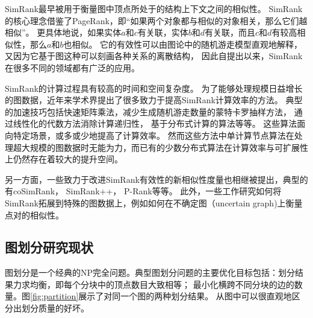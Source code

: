 \documentclass[master]{njuthesis}
\begin{document}
SimRank\cite{jeh2002simrank}最早被用于衡量图中顶点所处于的结构上下文之间的相似性。
SimRank的核心理念借鉴了PageRank\cite{page1999pagerank}，即“如果两个对象都与相似的对象相关，那么它们越相似”。
更具体地说，如果实体$a$和$c$有关联，实体$b$和$d$有关联，而且$c$和$d$有较高相似性，那么$a$和$b$也相似。
它的有效性可以由图论中的随机游走模型直观地解释，又因为它基于图这种可以刻画各种关系的离散结构，
因此自提出以来，SimRank在很多不同的领域都有广泛的应用。

SimRank的计算过程具有较高的时间和空间复杂度。
为了能够处理规模日益增长的图数据，近年来学术界提出了很多致力于提高SimRank计算效率的方法。
典型的加速技巧包括快速矩阵乘法\cite{yu2012space}，减少生成随机游走数量的蒙特卡罗抽样方法\cite{kusumoto2014scalable}，
通过线性化的代数方法消除计算递归性\cite{DBLP:journals/corr/MaeharaKK14}，
基于分布式计算的算法\cite{cao2012delta}等等。
这些算法面向特定场景，或多或少地提高了计算效率。
然而这些方法中单计算节点算法在处理超大规模的图数据时无能为力，而已有的少数分布式算法在计算效率与可扩展性上仍然存在着较大的提升空间。

另一方面，一些致力于改进SimRank有效性的新相似性度量也相继被提出，典型的有coSimRank\cite{DBLP:conf/acl/RotheS14}，
SimRank++\cite{DBLP:journals/pvldb/AntonellisGC08}，
P-Rank\cite{DBLP:conf/cikm/ZhaoHS09}等等。
此外，一些工作研究如何将SimRank拓展到特殊的图数据上，例如如何在不确定图\cite{DBLP:conf/icde/ZhuZL16}（uncertain graph)上衡量点对的相似性。

\subsection{图划分研究现状}
图划分是一个经典的NP完全问题。典型图划分问题的主要优化目标包括：划分结果力求均衡，即每个分块中的顶点数目大致相等；
最小化横跨不同分块的边的数量。图\ref{fig:partition}展示了对同一个图的两种划分结果。
从图中可以很直观地区分出划分质量的好坏。
\end{document}
